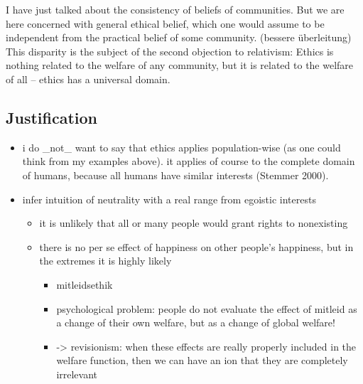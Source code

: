 I have just talked about the consistency of beliefs of communities. But we are here concerned with general ethical belief, which one would assume to be independent from the practical belief of some community. (bessere überleitung) This disparity is the subject of the second objection to relativism: Ethics is nothing related to the welfare of any community, but it is related to the welfare of all – ethics has a universal domain. 

\subsection{Justification}

\begin{itemize} \item i do \_not\_ want to say that ethics applies population-wise (as one could think from my examples above). it applies of course to the complete domain of humans, because all humans have similar interests (\label{ref:RNDitrDlHBuIn}Stemmer 2000). \item infer intuition of neutrality with a real range from egoistic interests 

\begin{itemize} \item it is unlikely that all or many people would grant rights to nonexisting \item there is no per se effect of happiness on other people’s happiness, but in the extremes it is highly likely 

\begin{itemize} \item mitleidsethik \item psychological problem: people do not evaluate the effect of mitleid as a change of their own welfare, but as a change of global welfare!  \item {}-{\textgreater} revisionism: when these effects are really properly included in the welfare function, then we can have an ion that they are completely irrelevant \end{itemize} \end{itemize} \end{itemize}